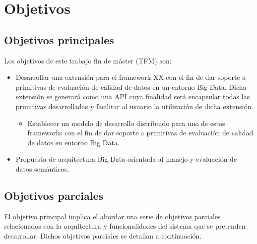 \chapter{Objetivos}
\label{chap:objetivos}

\section{Objetivos principales}

Los objetivos de este trabajo fin de máster (\acf{TFM}) son:

\begin{itemize}
\item Desarrollar una extensión para el framework XX con el fin de dar soporte a primitivas de evaluación de
  calidad de datos en un entorno Big Data. Dicha extensión se generará como una \acs{API} cuya finalidad será encapsular todas
las primitivas desarrolladas y facilitar al usuario la utilización de dicha
extensión.

\begin{itemize}
\item Establecer un modelo de
  desarrollo distribuido para uno de estos frameworks con el fin de dar soporte
  a primitivas de evaluación de calidad de datos en entorno Big Data.
\end{itemize}

\item Propuesta de arquitectura Big Data orientada al manejo y evaluación de
  datos semánticos.
\end{itemize}

\section{Objetivos parciales}

El objetivo principal implica el abordar una serie de objetivos parciales
relacionados con la arquitectura y funcionalidades del sistema que se pretenden
desarrollar. Dichos objetivos parciales se detallan a continuación. 


